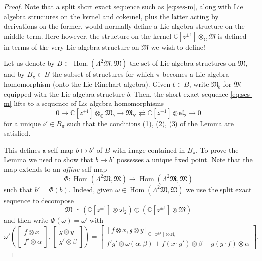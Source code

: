 \documentclass{article}
\def\fsl{\mathfrak{sl}}
\def\fM{\mathfrak{M}}
\def\CC{\mathbb{C}}
\DeclareMathOperator{\Hom}{\mathrm{Hom}}
\theoremstyle{definition}
\begin{document}
\begin{proof}
        Note that a split short exact sequence such as \eqref{eq:ses-m},
        along with Lie algebra structures on the kernel and cokernel,
        plus the latter acting by derivations on the former,
        would normally define a Lie algebra structure on the middle term.
        Here however, the structure on the kernel $\CC[z^{\pm1}]\otimes_\CC\fM$
        is defined in terms of the very Lie algebra structure on $\fM$ we wish
        to define!

        Let us denote by $B \subset \Hom(\Lambda^2\fM,\fM)$ the set 
        of Lie algebra structures on $\fM$, and
        by $B_\pi\subset B$ the subset of structures for which $\pi$ becomes
        a Lie algebra homomorphism (onto the Lie-Rinehart algebra).
        Given $b \in B$, write $\fM_b$ for $\fM$ equipped with the Lie algebra
        structure $b$. Then, the short exact sequence \eqref{eq:ses-m} lifts
        to a sequence of Lie algebra homomorphisms
        $$ 0 \to \CC[z^{\pm1}]\otimes_\CC \fM_b \to \fM_{b'} \rightleftarrows \CC[z^{\pm1}]\otimes\fsl_2\to 0$$
        for a unique $b' \in B_\pi$ such that
        the conditions (1), (2), (3) of the Lemma are satisfied.

        This defines a self-map $b\mapsto b'$ of $B$ with image
        contained in $B_\pi$. To prove the Lemma 
        we need to show that $b\mapsto b'$ possesses a unique fixed point.
        Note that the map extends to an \emph{affine} self-map 
        $$\Phi : \Hom(\Lambda^2\fM,\fM) \to \Hom(\Lambda^2\fM,\fM)$$ such that $b'=\Phi(b)$.
        Indeed, given $\omega \in \Hom(\Lambda^2\fM,\fM)$ we use
        the split exact sequence to decompose
        $$ \fM \simeq \left(\CC[z^{\pm1}]\otimes\fsl_2\right) \oplus \left(\CC[z^{\pm1}]\otimes\fM\right) $$ 
        and then write $\Phi(\omega)=\omega'$ with
$$ 
\omega'\left(
\left[\begin{matrix}f\otimes x \\ f'\otimes\alpha\end{matrix}\right], \left[\begin{matrix}g\otimes y \\ g'\otimes\beta\end{matrix}\right]\right) 
= 
\left[\begin{matrix}
[f\otimes x,g\otimes y]_{\CC[z^{\pm1}]\otimes\fsl_2} 
\\
f'g'\otimes\omega(\alpha,\beta) 
+ f(x\cdot g')\otimes\beta - g(y\cdot f)\otimes\alpha
\end{matrix}\right].$$


\end{proof}
\end{document}
